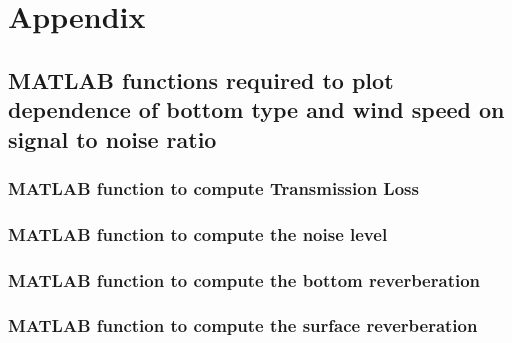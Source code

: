 \chapter*{Appendix}

\section{ MATLAB functions required to plot dependence of bottom type and wind speed on signal to noise ratio } \label{ MATLAB functions required to plot dependence of bottom type and wind speed on signal to noise ratio }

\subsection{ MATLAB function to compute Transmission Loss} \label{ MATLAB program to compute transmission loss } 


\subsection{ MATLAB function to compute the noise level} \label{ MATLAB function to compute the noise level} 


\subsection{ MATLAB function to compute the bottom reverberation} \label{ MATLAB function to compute the bottom reverberation} 


\subsection{ MATLAB function to compute the surface reverberation} \label{ MATLAB function to compute the surface reverberation} 


